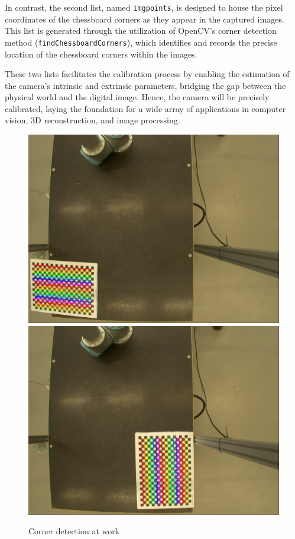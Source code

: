 \documentclass{article}
\def\code#1{\texttt{#1}}
\begin{document}
In contrast, the second list, named \code{imgpoints}, is designed to house the pixel coordinates of the chessboard corners as they appear in the captured images. This list is generated through the utilization of OpenCV's corner detection method (\code{findChessboardCorners}), which identifies and records the precise location of the chessboard corners within the images. 

These two lists facilitates the calibration process by enabling the estimation of the camera's intrinsic and extrinsic parameters, bridging the gap between the physical world and the digital image. Hence, the camera will be precisely calibrated, laying the foundation for a wide array of applications in computer vision, 3D reconstruction, and image processing.

\begin{figure}[h]
    \centering
    \includegraphics[scale=0.12]{process1.png} \qquad \includegraphics[scale=0.12]{Images/process2.png}
    \caption{Corner detection at work}
    \label{k}
\end{figure}
\end{document}
